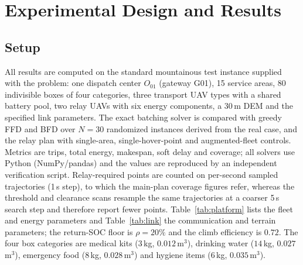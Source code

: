 \documentclass[journal]{IEEEtran}
\begin{document}
\section{Experimental Design and Results}\label{sec:exp}
\subsection{Setup}
All results are computed on the standard mountainous test instance supplied with
the problem: one dispatch center $O_{01}$ (gateway G01), 15 service areas, 80
indivisible boxes of four categories, three transport UAV types with a shared
battery pool, two relay UAVs with six energy components, a 30\,m DEM and the
specified link parameters. The exact batching solver is compared with greedy FFD
and BFD over $N{=}30$ randomized instances derived from the real case, and the
relay plan with single-area, single-hover-point and augmented-fleet controls.
Metrics are trips, total energy, makespan, soft delay and coverage; all solvers
use Python (NumPy/pandas) and the values are reproduced by an independent
verification script. Relay-required points are counted on per-second sampled
trajectories (1\,s step), to which the main-plan coverage figures refer, whereas
the threshold and clearance scans resample the same trajectories at a coarser
5\,s search step and therefore report fewer points. Table~\ref{tab:platform}
lists the fleet and energy parameters and Table~\ref{tab:link} the communication
and terrain parameters; the return-SOC floor is $\rho=20\%$ and the climb
efficiency is $0.72$. The four box categories are medical kits ($3$\,kg,
$0.012$\,m$^3$), drinking water ($14$\,kg, $0.027$\,m$^3$), emergency food
($8$\,kg, $0.028$\,m$^3$) and hygiene items ($6$\,kg, $0.035$\,m$^3$).
\end{document}
